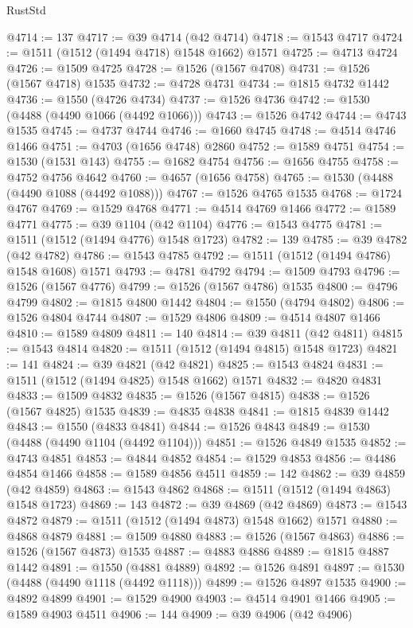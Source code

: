 \begin{lexlean}{RustStd}
\begin{coremodule}
{{@4714 := 137
@4717 := @39 @4714 (@42 @4714)
@4718 := @1543 @4717
@4724 := @1511 (@1512 (@1494 @4718) @1548 @1662) @1571
@4725 := @4713 @4724
@4726 := @1509 @4725
@4728 := @1526 (@1567 @4708)
@4731 := @1526 (@1567 @4718) @1535
@4732 := @4728 @4731
@4734 := @1815 @4732 @1442
@4736 := @1550 (@4726 @4734)
@4737 := @1526 @4736
@4742 := @1530 (@4488 (@4490 @1066 (@4492 @1066)))
@4743 := @1526 @4742
@4744 := @4743 @1535
@4745 := @4737 @4744
@4746 := @1660 @4745
@4748 := @4514 @4746 @1466
@4751 := @4703 (@1656 @4748) @2860
@4752 := @1589 @4751
@4754 := @1530 (@1531 @143)
@4755 := @1682 @4754
@4756 := @1656 @4755
@4758 := @4752 @4756 @4642
@4760 := @4657 (@1656 @4758)
@4765 := @1530 (@4488 (@4490 @1088 (@4492 @1088)))
@4767 := @1526 @4765 @1535
@4768 := @1724 @4767
@4769 := @1529 @4768
@4771 := @4514 @4769 @1466
@4772 := @1589 @4771
@4775 := @39 @1104 (@42 @1104)
@4776 := @1543 @4775
@4781 := @1511 (@1512 (@1494 @4776) @1548 @1723)
@4782 := 139
@4785 := @39 @4782 (@42 @4782)
@4786 := @1543 @4785
@4792 := @1511 (@1512 (@1494 @4786) @1548 @1608) @1571
@4793 := @4781 @4792
@4794 := @1509 @4793
@4796 := @1526 (@1567 @4776)
@4799 := @1526 (@1567 @4786) @1535
@4800 := @4796 @4799
@4802 := @1815 @4800 @1442
@4804 := @1550 (@4794 @4802)
@4806 := @1526 @4804 @4744
@4807 := @1529 @4806
@4809 := @4514 @4807 @1466
@4810 := @1589 @4809
@4811 := 140
@4814 := @39 @4811 (@42 @4811)
@4815 := @1543 @4814
@4820 := @1511 (@1512 (@1494 @4815) @1548 @1723)
@4821 := 141
@4824 := @39 @4821 (@42 @4821)
@4825 := @1543 @4824
@4831 := @1511 (@1512 (@1494 @4825) @1548 @1662) @1571
@4832 := @4820 @4831
@4833 := @1509 @4832
@4835 := @1526 (@1567 @4815)
@4838 := @1526 (@1567 @4825) @1535
@4839 := @4835 @4838
@4841 := @1815 @4839 @1442
@4843 := @1550 (@4833 @4841)
@4844 := @1526 @4843
@4849 := @1530 (@4488 (@4490 @1104 (@4492 @1104)))
@4851 := @1526 @4849 @1535
@4852 := @4743 @4851
@4853 := @4844 @4852
@4854 := @1529 @4853
@4856 := @4486 @4854 @1466
@4858 := @1589 @4856 @4511
@4859 := 142
@4862 := @39 @4859 (@42 @4859)
@4863 := @1543 @4862
@4868 := @1511 (@1512 (@1494 @4863) @1548 @1723)
@4869 := 143
@4872 := @39 @4869 (@42 @4869)
@4873 := @1543 @4872
@4879 := @1511 (@1512 (@1494 @4873) @1548 @1662) @1571
@4880 := @4868 @4879
@4881 := @1509 @4880
@4883 := @1526 (@1567 @4863)
@4886 := @1526 (@1567 @4873) @1535
@4887 := @4883 @4886
@4889 := @1815 @4887 @1442
@4891 := @1550 (@4881 @4889)
@4892 := @1526 @4891
@4897 := @1530 (@4488 (@4490 @1118 (@4492 @1118)))
@4899 := @1526 @4897 @1535
@4900 := @4892 @4899
@4901 := @1529 @4900
@4903 := @4514 @4901 @1466
@4905 := @1589 @4903 @4511
@4906 := 144
@4909 := @39 @4906 (@42 @4906)
}}
\end{coremodule}
\end{lexlean}
